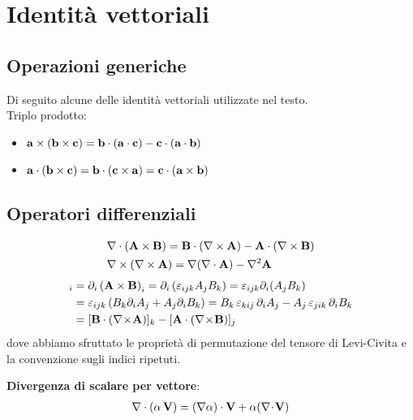 \chapter{Identità vettoriali}

\section{Operazioni generiche}
Di seguito alcune delle identità vettoriali utilizzate nel testo.\\
Triplo prodotto:
\begin{itemize}
  \item $ \mathbf{ a \times (b \times c) } = \mathbf{ b \cdot (a \cdot c) } - \mathbf{ c\cdot (a \cdot b) } $
  \item $ \mathbf{ a \cdot \left( b \times c \right) } = \mathbf{ b \cdot \left( c \times a \right) } = \mathbf{ c \cdot \left( a \times b \right) } $
\end{itemize}

\section{Operatori differenziali}
\begin{align}
  \label{identity: div(A times B)}
  &\nabla \cdot \mathbf{ (A \times B) } = \mathbf{ B \cdot (\nabla \times A) } - \mathbf{ A \cdot (\nabla \times B) }
  \\
  \label{identity: rot(rot A)}
  &\nabla \times \mathbf{ (\nabla \times \mathbf{ A }) } = \nabla (\nabla \cdot \mathbf{ A }) - \nabla ^2 \mathbf{ A }
\end{align}
\begin{align}
  [\nabla  \cdot \left( \v{ A \times B } \right)]_i &= \partial_i \left( \v{ A \times B } \right)_i = \partial_i \left( \eps_{i j k} A_j B_k \right) 
  = \eps_{i j k} \partial_i (A_j B_k) 
  \\
  &= \eps_{i j k} \left( B_k \partial_i A_j + A_j \partial_i B_k\right) = B_k \, \eps_{k i j} \, \partial_i A_j - A_j \, \eps_{j i k} \, \partial_i B_k 
  \\
  &= [\v{ B } \cdot (\nabla\!\times\!\v{ A })]_k - [\v{ A } \cdot (\nabla\!\times\!\v{ B })]_j
\end{align}
dove abbiamo sfruttato le proprietà di permutazione del tensore di Levi-Civita e la convenzione sugli indici ripetuti.

\textbf{Divergenza di scalare per vettore}:
\begin{align} \label{identity:_divergenza(scalare_per_vettore)}
  \nabla \cdot \left( \alpha \, \mathbf{V} \right) = (\nabla \alpha) \cdot \mathbf{V} + \alpha (\nabla\!\cdot\!\mathbf{ V })
\end{align}


